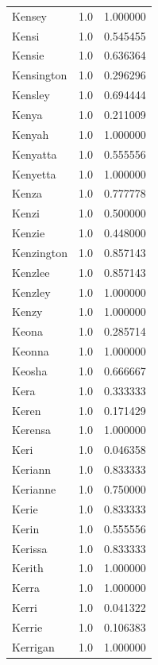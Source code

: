 \documentclass[
  letterpaper,
  DIV=11,
  numbers=noendperiod]{scrreprt}
\begin{document}
\begin{tabular}{lrr}
Kensey          &   1.0 &   1.000000 \\
Kensi           &   1.0 &   0.545455 \\
Kensie          &   1.0 &   0.636364 \\
Kensington      &   1.0 &   0.296296 \\
Kensley         &   1.0 &   0.694444 \\
Kenya           &   1.0 &   0.211009 \\
Kenyah          &   1.0 &   1.000000 \\
Kenyatta        &   1.0 &   0.555556 \\
Kenyetta        &   1.0 &   1.000000 \\
Kenza           &   1.0 &   0.777778 \\
Kenzi           &   1.0 &   0.500000 \\
Kenzie          &   1.0 &   0.448000 \\
Kenzington      &   1.0 &   0.857143 \\
Kenzlee         &   1.0 &   0.857143 \\
Kenzley         &   1.0 &   1.000000 \\
Kenzy           &   1.0 &   1.000000 \\
Keona           &   1.0 &   0.285714 \\
Keonna          &   1.0 &   1.000000 \\
Keosha          &   1.0 &   0.666667 \\
Kera            &   1.0 &   0.333333 \\
Keren           &   1.0 &   0.171429 \\
Kerensa         &   1.0 &   1.000000 \\
Keri            &   1.0 &   0.046358 \\
Keriann         &   1.0 &   0.833333 \\
Kerianne        &   1.0 &   0.750000 \\
Kerie           &   1.0 &   0.833333 \\
Kerin           &   1.0 &   0.555556 \\
Kerissa         &   1.0 &   0.833333 \\
Kerith          &   1.0 &   1.000000 \\
Kerra           &   1.0 &   1.000000 \\
Kerri           &   1.0 &   0.041322 \\
Kerrie          &   1.0 &   0.106383 \\
Kerrigan        &   1.0 &   1.000000 \\

\end{tabular}
\end{document}
